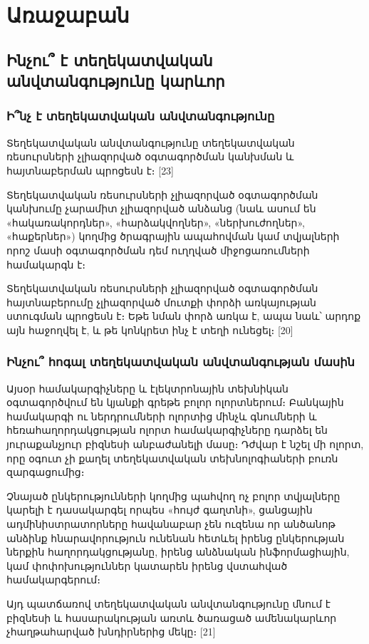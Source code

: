 \documentclass[a4paper,12pt]{article}
\begin{document}
\begin{sloppypar}
\section{Առաջաբան}


\subsection{Ինչու՞ է տեղեկատվական անվտանգությունը կարևոր}


\subsubsection{Ի՞նչ է տեղեկատվական անվտանգությունը}

Տեղեկատվական անվտանգությունը տեղեկատվական ռեսուրսների չլիազորված օգտագործման
կանխման և հայտնաբերման պրոցեսն է։ [23]

Տեղեկատվական ռեսուրսների չլիազորված օգտագործման
կանխումը չարամիտ չլիազորված անձանց (նաև ասում են «հակառակորդներ»,
«հարձակվողներ», «ներխուժողներ», «հաքերներ») կողմից ծրագրային ապահովման կամ
տվյալների որոշ մասի օգտագործման դեմ ուղղված միջոցառումների համակարգն է։

Տեղեկատվական ռեսուրսների չլիազորված օգտագործման
հայտնաբերումը չլիազորված մուտքի փորձի առկայության ստուգման պրոցեսն է։ Եթե
նման փորձ առկա է, ապա նաև՝ արդոք այն հաջողվել է, և թե կոնկրետ ինչ է տեղի
ունեցել։ [20]

\subsubsection{Ինչու՞ հոգալ տեղեկատվական անվտանգության մասին}

Այսօր համակարգիչները և էլեկտրոնային տեխնիկան օգտագործվում են
կյանքի գրեթե բոլոր ոլորտներում։ Բանկային համակարգի ու ներդրումների ոլորտից
մինչև գնումների և հեռահաղորդակցության ոլորտ համակարգիչները դարձել են
յուրաքանչյուր բիզնեսի անբաժանելի մասը։ Դժվար է նշել մի ոլորտ, որը
օգուտ չի քաղել տեղեկատվական տեխնոլոգիաների բուռն զարգացումից։

Չնայած ընկերությունների կողմից պահվող ոչ բոլոր տվյալները կարելի է
դասակարգել որպես «հույժ գաղտնի», ցանցային ադմինիստրատորները հավանաբար
չեն ուզենա որ անծանոթ անձինք հնարավորություն ունենան հետևել
իրենց ընկերության ներքին հաղորդակցությանը,
իրենց անձնական ինֆորմացիային, կամ փոփոխություններ կատարեն իրենց վստահված
համակարգերում։

Այդ պատճառով տեղեկատվական անվտանգությունը մնում է բիզնեսի և հասարակության
առտև ծառացած ամենակարևոր չհաղթահարված խնդիրներից մեկը։ [21]


\end{sloppypar}
\end{document}
